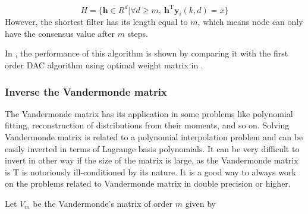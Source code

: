 \begin{equation}
H=\{\mathbf{h}\in R^{d}|\forall d\geqslant m,\:\mathbf{h}^{\mathrm{T}}\mathbf{y}_{i}(k,d)=\bar{x}\}
\end{equation}
However, the shortest filter has its length equal to $m$, which means
node can only have the consensus value after $m$ steps. 

In , the performance of this
algorithm is shown by comparing it with the first order DAC algorithm
using optimal weight matrix in \cite{Xiao2004}.


\subsubsection{Inverse the Vandermonde matrix}

The Vandermonde matrix has its application in some problems like polynomial
fitting, reconstruction of distributions from their moments, and so
on. Solving Vandermonde matrix is related to a polynomial interpolation
problem and can be easily inverted in terms of Lagrange basis polynomials.
It can be very difficult to invert in other way if the size of the
matrix is large, as the Vandermonde matrix is T is notoriously ill-conditioned
by its nature. It is a good way to always work on the problems related
to Vandermonde matrix in double precision or higher. 

Let $V_{m}$ be the Vandermonde's matrix of order $m$ given by 

